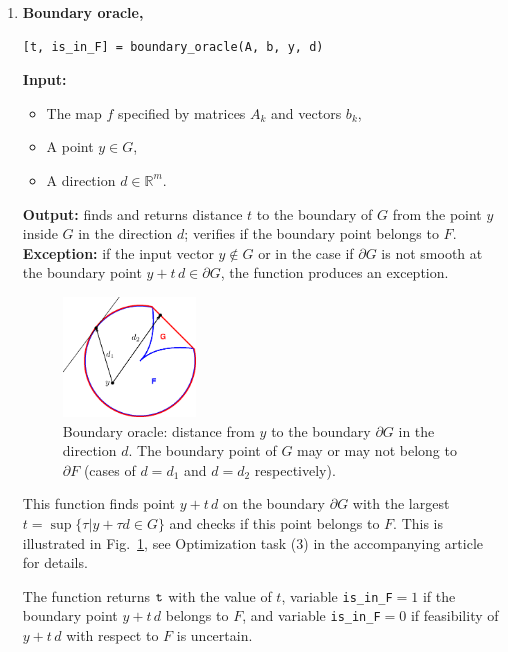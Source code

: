 \documentclass[a4paper]{article}
\newcommand{\R}{\mathbb{R}}
\theoremstyle{definition}
\begin{document}
\begin{enumerate}
Procedure returns {\tt is\_infeasible}$=1$ if the desired hyperplane was found.
In this case $y\notin G$ and consequently $y\notin F$, implying there is no $x\in \mathbb{V}$ such that $y=f(x)$, i.e.~this point is infeasible.
If the hyperplane was not found the function returns {\tt is\_infeasible}$=0$, which means the feasibility  of $y$ with respect to $F$ is uncertain.
\newpage
\item {\bf Boundary oracle,\hskip 6pt}
\begin{verbatim}
[t, is_in_F] = boundary_oracle(A, b, y, d)
\end{verbatim}
{\bf Input:}
\begin{itemize}
	\item The map $f$ specified by matrices $A_k$ and vectors $b_k$,
	\item A point $y\in G$,
	\item A direction $d\in\R^m$.
\end{itemize}
{\bf Output:}  finds and returns distance $t$ to the boundary of $G$ from the point $y$ inside $G$ in the direction $d$; verifies if the boundary point belongs to $F$.\\
{\bf Exception:}  if the input vector $y\notin G$ or in the case if $\partial G$ is not smooth at the boundary point $y+t\,d\in \partial G$, the function produces an exception.


\begin{figure}[H]
	\centering\includegraphics[width=100pt]{fig/boundary_oracle}
	\caption{Boundary oracle: distance from $y$ to the boundary $\partial G$ in the direction $d$.
	The boundary point of $G$ may or may not belong to $\partial F$ (cases of $d=d_1$ and $d=d_2$ respectively).}
\label{fig:two}
\end{figure}


This function finds point $y+t\,d$ on the boundary $\partial G$ with the largest $ {t} = \sup\{\tau\big| y+\tau d\in G\}$ and checks if this point belongs to $F$. 
This is illustrated in Fig.~\ref{fig:two}, see Optimization task (3) in the accompanying article for details.

The function returns $\tt t$ with the value of $t$, variable {\tt  is\_in\_F}$=1$ if the boundary point $y+t\,d$ belongs to $F$, and variable {\tt  is\_in\_F}$=0$ if feasibility of $y+t\,d$ with respect to $F$ is uncertain.


\end{enumerate}
\end{document}
